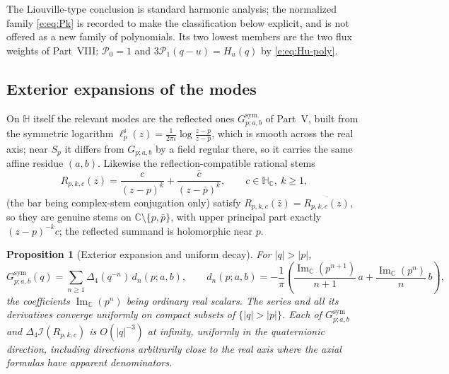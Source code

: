 \documentclass[11pt,a4paper]{article}
\numberwithin{equation}{section}
\newtheorem{proposition}[theorem]{Proposition}
\theoremstyle{definition}
\theoremstyle{remark}
\theoremstyle{plain}
\newcommand{\HH}{\mathbb H}
\newcommand{\HC}{\mathbb H_{\mathbb C}}
\newcommand{\CC}{\mathbb C}
\DeclareMathOperator{\Ima}{Im}
\newcommand{\lap}{\Delta_4}
\newcommand{\I}{\mathcal I}
\newcommand{\Sp}{S_{p}}
\newcommand{\abs}[1]{\lvert #1\rvert}
\begin{document}
The Liouville-type conclusion is standard harmonic analysis; the
normalized family \eqref{e:eq:Pk} is recorded to make the classification
below explicit, and is not offered as a new family of polynomials. Its
two lowest members are the two flux weights of Part~VIII:
$\mathcal P_0=1$ and $3\mathcal P_1(q-u)=H_u(q)$ by
\eqref{e:eq:Hu-poly}.

\subsection{Exterior expansions of the modes}
\label{e:sec:exterior}

On $\HH$ itself the relevant modes are the reflected ones
$G^{\mathrm{sym}}_{p;a,b}$ of Part~V, built from the symmetric logarithm
$\ell^{\mathrm s}_p(z)=\frac1{2\pi\iota}\log\frac{z-p}{z-\bar p}$, which
is smooth across the real axis; near $\Sp$ it differs from
$G_{p;a,b}$ by a field regular there, so it carries the same affine
residue $(a,b)$. Likewise the reflection-compatible rational stems
\begin{equation}
 R_{p,k,c}(z)=\frac{c}{(z-p)^k}+\frac{\bar c}{(z-\bar p)^k},
 \qquad c\in\HC,\ k\ge1,
 \label{e:eq:pairedrational}
\end{equation}
(the bar being complex-stem conjugation only) satisfy
$R_{p,k,c}(\bar z)=\overline{R_{p,k,c}(z)}$, so they are genuine stems on
$\CC\setminus\{p,\bar p\}$, with upper principal part exactly
$(z-p)^{-k}c$; the reflected summand is holomorphic near $p$.

\begin{proposition}[Exterior expansion and uniform decay]
\label{e:prop:exterior}
For $\abs q>\abs p$,
\begin{equation}
 G^{\mathrm{sym}}_{p;a,b}(q)=\sum_{n\ge1}\lap(q^{-n})\,d_n(p;a,b),
 \qquad
 d_n(p;a,b)=-\frac1\pi\left(
   \frac{\Ima_{\CC}(p^{n+1})}{n+1}\,a
  +\frac{\Ima_{\CC}(p^{n})}{n}\,b\right),
 \label{e:eq:exterior}
\end{equation}
the coefficients $\Ima_{\CC}(p^n)$ being ordinary real scalars. The
series and all its derivatives converge uniformly on compact subsets of
$\{\abs q>\abs p\}$. Each of $G^{\mathrm{sym}}_{p;a,b}$ and
$\lap\I(R_{p,k,c})$ is $O(\abs q^{-3})$ at infinity, uniformly in the
quaternionic direction, including directions arbitrarily close to the
real axis where the axial formulas have apparent denominators.
\end{proposition}
\end{document}
